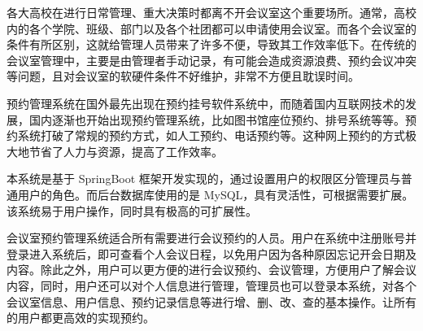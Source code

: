 \documentclass{izdthesis}
\begin{document}
\makecover

\makedeclaration

\begin{cnabstract}
各大高校在进行日常管理、重大决策时都离不开会议室这个重要场所。通常，高校内的各个学院、班级、部门以及各个社团都可以申请使用会议室。而各个会议室的条件有所区别，这就给管理人员带来了许多不便，导致其工作效率低下。在传统的会议室管理中，主要是由管理者手动记录，有可能会造成资源浪费、预约会议冲突等问题，且对会议室的软硬件条件不好维护，非常不方便且耽误时间。

预约管理系统在国外最先出现在预约挂号软件系统中，而随着国内互联网技术的发展，国内逐渐也开始出现预约管理系统，比如图书馆座位预约、排号系统等等。预约系统打破了常规的预约方式，如人工预约、电话预约等。这种网上预约的方式极大地节省了人力与资源，提高了工作效率。

本系统是基于 SpringBoot 框架开发实现的，通过设置用户的权限区分管理员与普通用户的角色。而后台数据库使用的是 MySQL，具有灵活性，可根据需要扩展。该系统易于用户操作，同时具有极高的可扩展性。

会议室预约管理系统适合所有需要进行会议预约的人员。用户在系统中注册账号并登录进入系统后，即可查看个人会议日程，以免用户因为各种原因忘记开会日期及内容。除此之外，用户可以更方便的进行会议预约、会议管理，方便用户了解会议内容，同时，用户还可以对个人信息进行管理，管理员也可以登录本系统，对各个会议室信息、用户信息、预约记录信息等进行增、删、改、查的基本操作。让所有的用户都更高效的实现预约。

\end{cnabstract}
\end{document}
